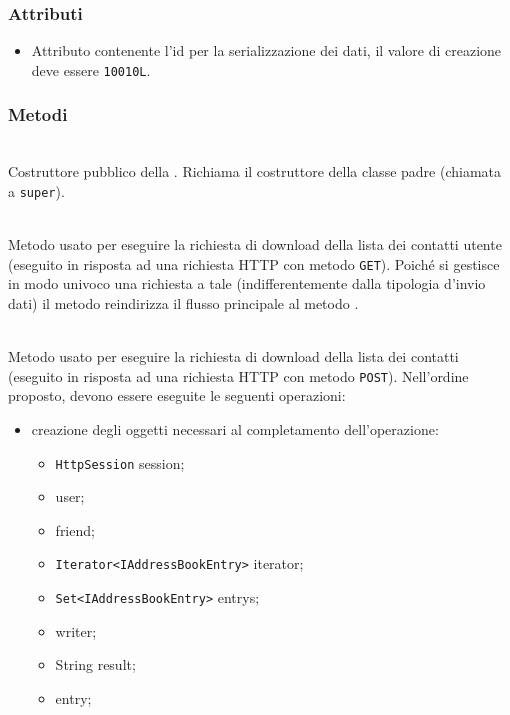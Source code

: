 \subsubsection*{Attributi}

\begin{itemize}
	\item{}
	Attributo contenente l'id per la serializzazione dei dati, il valore di creazione deve essere \texttt{10010L}.
\end{itemize}

\subsubsection*{Metodi}

\begin{description}
	\item{}\\
	Costruttore pubblico della . Richiama il costruttore della classe padre (chiamata a \texttt{super}).
	
	\item{}\\
	Metodo usato per eseguire la richiesta di download della lista dei contatti utente (eseguito in risposta ad una richiesta HTTP con metodo \texttt{GET}). Poiché si gestisce in modo univoco una richiesta a tale  (indifferentemente dalla tipologia d'invio dati) il metodo reindirizza il flusso principale al metodo .
	
	\item{}\\	
	Metodo usato per eseguire la richiesta di download della lista dei contatti (eseguito in risposta ad una richiesta HTTP con metodo \texttt{POST}). Nell'ordine proposto, devono essere eseguite le seguenti operazioni:
	\begin{itemize}
		\item creazione degli oggetti necessari al completamento dell'operazione:
		\begin{itemize}
			\item \texttt{HttpSession} session;
			\item {} user;
			\item {} friend;
			\item \texttt{Iterator<IAddressBookEntry>} iterator;
			\item \texttt{Set<IAddressBookEntry>} entrys;
			\item {} writer;
			\item String result;
			\item {} entry;
		\end{itemize}
		

\end{itemize}
\end{description}
